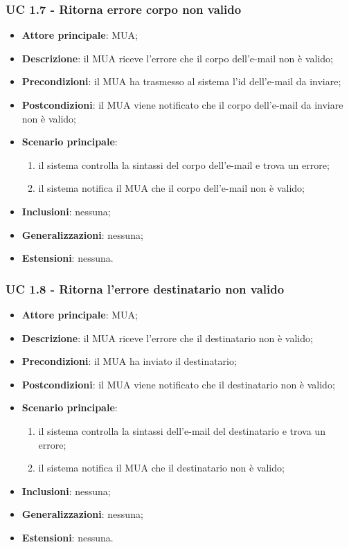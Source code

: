     \subsubsection{UC 1.7 - Ritorna errore corpo non valido} \label{sec:UC1.7}
    \begin{itemize}
        \item \textbf{Attore principale}: MUA;
        \item \textbf{Descrizione}: il MUA riceve l'errore che il corpo dell'e-mail non è valido;
        \item \textbf{Precondizioni}: il MUA ha trasmesso al sistema l'id dell'e-mail da inviare;
        \item \textbf{Postcondizioni}: il MUA viene notificato che il corpo dell'e-mail da inviare non è valido;
        \item \textbf{Scenario principale}:
            \begin{enumerate}
                \item il sistema controlla la sintassi del corpo dell'e-mail e trova un errore;
                \item il sistema notifica il MUA che il corpo dell'e-mail non è valido;
            \end{enumerate}
        \item \textbf{Inclusioni}: nessuna;
        \item \textbf{Generalizzazioni}: nessuna;
        \item \textbf{Estensioni}: nessuna.
    \end{itemize}



    \subsubsection{UC 1.8 - Ritorna l'errore destinatario non valido} \label{sec:UC1.8}
    \begin{itemize}
        \item \textbf{Attore principale}: MUA;
        \item \textbf{Descrizione}: il MUA riceve l'errore che il destinatario non è valido;
        \item \textbf{Precondizioni}: il MUA ha inviato il destinatario;
        \item \textbf{Postcondizioni}: il MUA viene notificato che il destinatario non è valido;
        \item \textbf{Scenario principale}:
            \begin{enumerate}
                \item il sistema controlla la sintassi dell'e-mail del destinatario e trova un errore;
                \item il sistema notifica il MUA che il destinatario non è valido;
            \end{enumerate}
        \item \textbf{Inclusioni}: nessuna;
        \item \textbf{Generalizzazioni}: nessuna;
        \item \textbf{Estensioni}: nessuna.
    \end{itemize}


